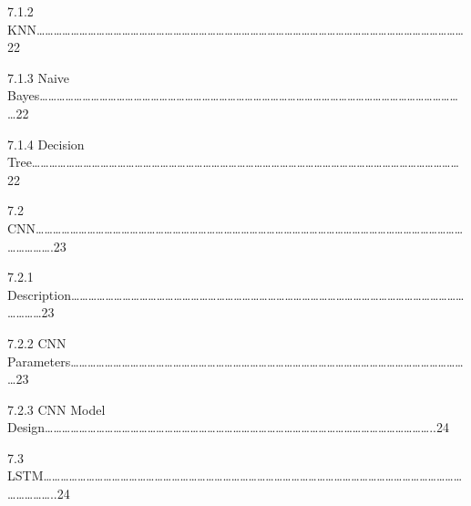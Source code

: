 \documentclass[a4paper,12pt]{article}
\begin{document}
7.1.2
KNN\ldots\ldots\ldots\ldots\ldots\ldots\ldots\ldots\ldots\ldots\ldots\ldots\ldots\ldots\ldots\ldots\ldots\ldots\ldots\ldots\ldots\ldots\ldots\ldots\ldots\ldots\ldots\ldots\ldots\ldots\ldots\ldots\ldots\ldots\ldots\ldots\ldots\ldots\ldots\ldots\ldots\ldots\ldots\ldots\ldots\ldots\ldots\ldots\ldots\ldots22

7.1.3
Naive Bayes\ldots\ldots\ldots\ldots\ldots\ldots\ldots\ldots\ldots\ldots\ldots\ldots\ldots\ldots\ldots\ldots\ldots\ldots\ldots\ldots\ldots\ldots\ldots\ldots\ldots\ldots\ldots\ldots\ldots\ldots\ldots\ldots\ldots\ldots\ldots\ldots\ldots\ldots\ldots\ldots\ldots\ldots\ldots\ldots\ldots\ldots\ldots\ldots\ldots\ldots22

7.1.4
Decision Tree\ldots\ldots\ldots\ldots\ldots\ldots\ldots\ldots\ldots\ldots\ldots\ldots\ldots\ldots\ldots\ldots\ldots\ldots\ldots\ldots\ldots\ldots\ldots\ldots\ldots\ldots\ldots\ldots\ldots\ldots\ldots\ldots\ldots\ldots\ldots\ldots\ldots\ldots\ldots\ldots\ldots\ldots\ldots\ldots\ldots\ldots\ldots\ldots\ldots\ldots22

7.2
CNN\ldots\ldots\ldots\ldots\ldots\ldots\ldots\ldots\ldots\ldots\ldots\ldots\ldots\ldots\ldots\ldots\ldots\ldots\ldots\ldots\ldots\ldots\ldots\ldots\ldots\ldots\ldots\ldots\ldots\ldots\ldots\ldots\ldots\ldots\ldots\ldots\ldots\ldots\ldots\ldots\ldots\ldots\ldots\ldots\ldots\ldots\ldots\ldots\ldots\ldots\ldots\ldots\ldots\ldots\ldots.23

7.2.1
Description\ldots\ldots\ldots\ldots\ldots\ldots\ldots\ldots\ldots\ldots\ldots\ldots\ldots\ldots\ldots\ldots\ldots\ldots\ldots\ldots\ldots\ldots\ldots\ldots\ldots\ldots\ldots\ldots\ldots\ldots\ldots\ldots\ldots\ldots\ldots\ldots\ldots\ldots\ldots\ldots\ldots\ldots\ldots\ldots\ldots\ldots\ldots\ldots\ldots\ldots23

7.2.2 CNN
Parameters\ldots\ldots\ldots\ldots\ldots\ldots\ldots\ldots\ldots\ldots\ldots\ldots\ldots\ldots\ldots\ldots\ldots\ldots\ldots\ldots\ldots\ldots\ldots\ldots\ldots\ldots\ldots\ldots\ldots\ldots\ldots\ldots\ldots\ldots\ldots\ldots\ldots\ldots\ldots\ldots\ldots\ldots\ldots\ldots\ldots\ldots\ldots23

7.2.3 CNN Model
Design\ldots\ldots\ldots\ldots\ldots\ldots\ldots\ldots\ldots\ldots\ldots\ldots\ldots\ldots\ldots\ldots\ldots\ldots\ldots\ldots\ldots\ldots\ldots\ldots\ldots\ldots\ldots\ldots\ldots\ldots\ldots\ldots\ldots\ldots\ldots\ldots\ldots\ldots\ldots\ldots\ldots\ldots\ldots\ldots\ldots..24

7.3
LSTM\ldots\ldots\ldots\ldots\ldots\ldots\ldots\ldots\ldots\ldots\ldots\ldots\ldots\ldots\ldots\ldots\ldots\ldots\ldots\ldots\ldots\ldots\ldots\ldots\ldots\ldots\ldots\ldots\ldots\ldots\ldots\ldots\ldots\ldots\ldots\ldots\ldots\ldots\ldots\ldots\ldots\ldots\ldots\ldots\ldots\ldots\ldots\ldots\ldots\ldots\ldots\ldots\ldots\ldots..24
\end{document}
